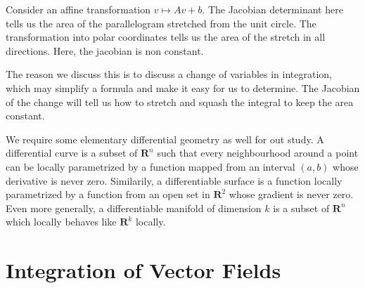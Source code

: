 \documentclass[12pt]{amsbook}
\theoremstyle{plain}
\theoremstyle{definition}
\begin{document}
Consider an affine transformation $v \mapsto Av + b$. The Jacobian determinant here tells us the area of the parallelogram stretched from the unit circle. The transformation into polar coordinates tells us the area of the stretch in all directions. Here, the jacobian is non constant.

The reason we discuss this is to discuss a change of variables in integration, which may simplify a formula and make it easy for us to determine. The Jacobian of the change will tell us how to stretch and squash the integral to keep the area constant.

We require some elementary differential geometry as well for out study. A differential curve is a subset of $\mathbf{R}^n$ such that every neighbourhood around a point can be locally parametrized by a function mapped from an interval $(a,b)$ whose derivative is never zero. Similarily, a differentiable surface is a function locally parametrized by a function from an open set in $\mathbf{R}^2$ whose gradient is never zero. Even more generally, a differentiable manifold of dimension $k$ is a subset of $\mathbf{R}^n$ which locally behaves like $\mathbf{R}^k$ locally.










\chapter{Integration of Vector Fields}
\end{document}
